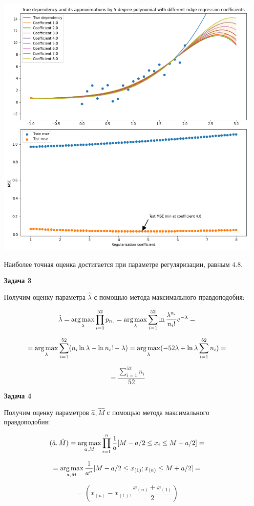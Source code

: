 \documentclass[10pt]{article}
\newcommand{\argmax}{\mathop{\rm arg\,max}\limits}
\begin{document}
	\includegraphics[width=.8\textwidth]{dependency hw2 task2.png}
	
	Наиболее точная оценка достигается при параметре регуляризации, равным $4.8$.
	
	\bigskip
	
	\textbf{Задача 3}
		
	\medskip
	
	Получим оценку параметра $\hat{\lambda }$ с помощью метода максимального правдоподобия:
	
	$$\hat{\lambda } = \argmax_\lambda \prod_{i=1}^{52} p_{n_i} = \argmax_\lambda \sum_{i=1}^{52} \ln \frac{\lambda^{n_i}}{n_i!}e^{-\lambda} = $$
	
	$$= \argmax_\lambda \sum_{i=1}^{52} (n_i \ln \lambda - \ln n_i! - \lambda) = \argmax_\lambda (- 52\lambda + \ln \lambda\sum_{i=1}^{52} n_i )  =$$
	
	$$ = \frac{\sum_{i=1}^{52} n_i}{52}$$
	
	\bigskip
	
	\textbf{Задача 4}
	
	\medskip
	
	Получим оценку параметров $\hat{a}, \hat{M}$ с помощью метода максимального правдоподобия:
	
	$$(\hat{ a }, \hat{M}) = \argmax_{a, M} \prod_{i=1}^{n} \frac{1}{a} [M-a/2 \leq x_i \leq M + a/2] = $$
	
	$$ = \argmax_{a, M}  \frac{1}{a^n} [M-a/2 \leq x_{(1)}; x_{(n)} \leq M + a/2] = $$
	
	$$ = \left( x_{(n)} - x_{(1)}, \frac{ x_{(n)} + x_{(1)} }  {2} \right)$$
	
	
\end{document}
